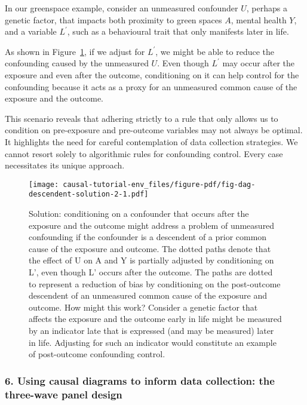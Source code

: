 \documentclass[
  singlecolumn]{article}
\begin{document}
In our greenspace example, consider an unmeasured confounder \(U\),
perhaps a genetic factor, that impacts both proximity to green spaces
\(A\), mental health \(Y\), and a variable \(L^\prime\), such as a
behavioural trait that only manifests later in life.

As shown in Figure~\ref{fig-dag-descendent-solution-2}, if we adjust for
\(L^\prime\), we might be able to reduce the confounding caused by the
unmeasured \(U\). Even though \(L^\prime\) may occur after the exposure
and even after the outcome, conditioning on it can help control for the
confounding because it acts as a proxy for an unmeasured common cause of
the exposure and the outcome.

This scenario reveals that adhering strictly to a rule that only allows
us to condition on pre-exposure and pre-outcome variables may not always
be optimal. It highlights the need for careful contemplation of data
collection strategies. We cannot resort solely to algorithmic rules for
confounding control. Every case necessitates its unique approach.

\begin{figure}

{\centering \texttt{[image: causal-tutorial-env\_files/figure-pdf/fig-dag-descendent-solution-2-1.pdf]}

}

\caption{\label{fig-dag-descendent-solution-2}Solution: conditioning on
a confounder that occurs after the exposure and the outcome might
address a problem of unmeasured confounding if the confounder is a
descendent of a prior common cause of the exposure and outcome. The
dotted paths denote that the effect of U on A and Y is partially
adjusted by conditioning on L', even though L' occurs after the outcome.
The paths are dotted to represent a reduction of bias by conditioning on
the post-outcome descendent of an unmeasured common cause of the
exposure and outcome. How might this work? Consider a genetic factor
that affects the exposure and the outcome early in life might be
measured by an indicator late that is expressed (and may be measured)
later in life. Adjusting for such an indicator would constitute an
example of post-outcome confounding control.}

\end{figure}

\hypertarget{using-causal-diagrams-to-inform-data-collection-the-three-wave-panel-design}{%
\subsubsection{6. Using causal diagrams to inform data collection: the
three-wave panel
design}\label{using-causal-diagrams-to-inform-data-collection-the-three-wave-panel-design}}
\end{document}
